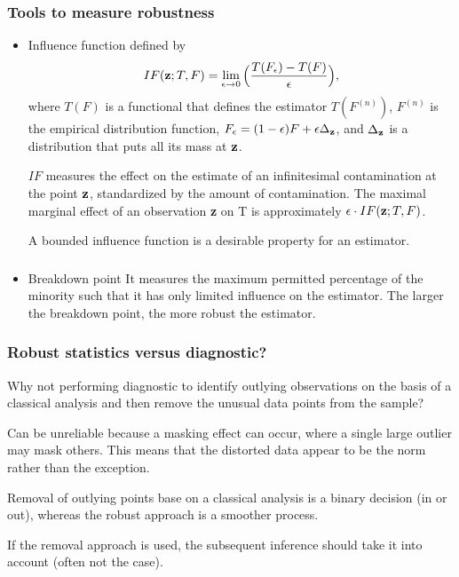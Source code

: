 \documentclass{beamer}
\newcommand{\bs}{\bigskip}
\begin{document}
\begin{frame}
\frametitle{Tools to measure robustness}
\begin{itemize}
\item{\color{blue}Influence function} defined by
$$IF({\bf z}; T , F) = \lim_{\epsilon \rightarrow 0} \Big(\frac{T(F_{\epsilon}) -
  T(F)}{\epsilon} \Big),$$
where $T(F)$ is a functional that defines the estimator $T(F^{(n)})$, $F^{(n)}$
is the empirical distribution function, $F_{\epsilon} = (1-\epsilon) F +
\epsilon \Delta_{\bf z}$, and $\Delta_{\bf z}$ is a distribution that puts all
its mass at ${\bf z}$.

$IF$ measures the effect on the estimate of an infinitesimal contamination at
the point ${\bf z}$, standardized by the amount of contamination. The maximal
marginal effect of an observation {\bf z} on T is approximately $\epsilon \cdot
IF({\bf z}; T , F)$.

A  {\color{blue}bounded influence function} is a desirable property for an
estimator.
\end{itemize}
\end{frame}


\begin{frame}
\frametitle{}
\begin{itemize}
\item {\color{blue}Breakdown point} It measures the maximum permitted
percentage of the minority such that it has only limited influence on the
estimator. The {\color{blue}larger} the breakdown point, the more robust the
estimator.
\end{itemize}
\end{frame}

\begin{frame}
\frametitle{Robust statistics versus diagnostic?}

\bs
Why not performing diagnostic to identify outlying observations on the basis of
a classical analysis and then remove the unusual data points from the
sample?

\bs
Can be unreliable because a {\color{blue}masking effect} can occur,
where a single large outlier may mask others. This means that the distorted data
appear to be the norm rather than the exception.


\bs
Removal of outlying points base on a classical analysis is a binary decision (in
or out), whereas the robust approach is a smoother process.

\bs
If the removal approach is used, the subsequent inference should take it into
account (often not the case).
\end{frame}
\end{document}
